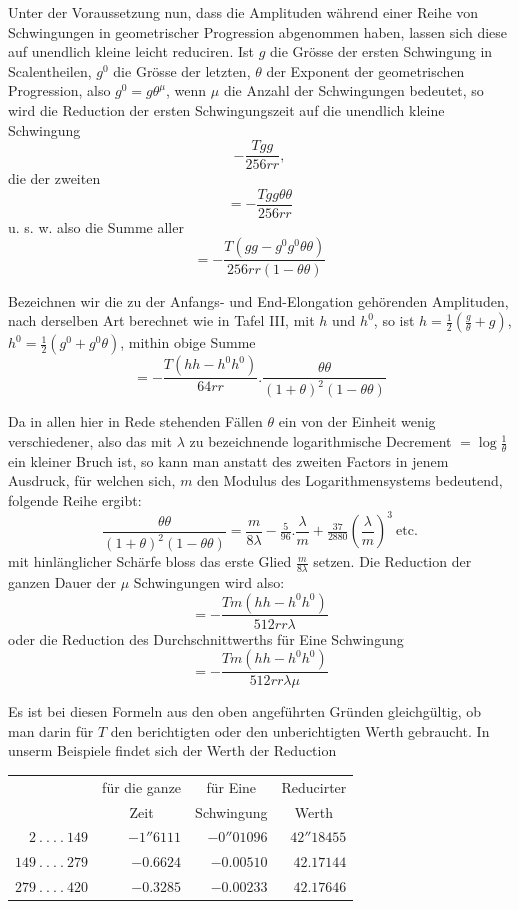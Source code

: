 Unter der Voraussetzung nun, dass die Amplituden während einer Reihe von Schwingungen in geometrischer Progression abgenommen haben, lassen sich diese auf unendlich kleine leicht reduciren. Ist $g$ die Grösse der ersten Schwingung in Scalentheilen, $g^0$ die Grösse der letzten, $\theta$ der Exponent der geometrischen Progression, also $g^0=g\theta^\mu$, wenn $\mu$ die Anzahl der Schwingungen bedeutet, so wird die Reduction der ersten Schwingungszeit auf die unendlich kleine Schwingung
\[
-\frac{Tgg}{256rr},
\]
die der zweiten
\[
=-\frac{Tgg\theta\theta}{256rr}
\]
u. s. w. also die Summe aller
\[
=-\frac{T(gg-g^0g^0\theta\theta)}{256rr(1-\theta\theta)}
\]

Bezeichnen wir die zu der Anfangs- und End-Elongation gehörenden Amplituden, nach derselben Art berechnet wie in Tafel III, mit $h$ und $h^0$, so ist $h=\tfrac12(\frac{g}{\theta}+g)$, $h^0=\tfrac12(g^0+g^0\theta)$, mithin obige Summe
\[
=-\frac{T(hh-h^0h^0)}{64rr}.\frac{\theta\theta}{(1+\theta)^2(1-\theta\theta)}
\]

Da in allen hier in Rede stehenden Fällen $\theta$ ein von der Einheit wenig verschiedener, also das mit $\lambda$ zu bezeichnende logarithmische Decrement $=\log\frac1\theta$ ein kleiner Bruch ist, so kann man anstatt des zweiten Factors in jenem Ausdruck, für welchen sich, $m$ den Modulus des Logarithmensystems bedeutend, folgende Reihe ergibt:
\[
\frac{\theta\theta}{(1+\theta)^2(1-\theta\theta)}=\frac{m}{8\lambda}-\tfrac5{96}.\frac{\lambda}{m}+\tfrac{37}{2880}(\frac{\lambda}{m})^3\ \text{etc.}
\]
mit hinlänglicher Schärfe bloss das erste Glied $\frac{m}{8\lambda}$ setzen. Die Reduction der ganzen Dauer der $\mu$ Schwingungen wird also:
\[
=-\frac{Tm(hh-h^0h^0)}{512rr\lambda}
\]
oder die Reduction des Durchschnittwerths für Eine Schwingung
\[
=-\frac{Tm(hh-h^0h^0)}{512rr\lambda\mu}
\]

Es ist bei diesen Formeln aus den oben angeführten Gründen gleichgültig, ob man darin für $T$ den berichtigten oder den unberichtigten Werth gebraucht. In unserm Beispiele findet sich der Werth der Reduction
\begin{center}
\fontsize{9}{11}\selectfont
\begin{tabular}{r|r|r|r}
& \multicolumn{1}{c|}{für die ganze} & \multicolumn{1}{c|}{für Eine} & \multicolumn{1}{c}{Reducirter}\\
& \multicolumn{1}{c|}{Zeit} & \multicolumn{1}{c|}{Schwingung} & \multicolumn{1}{c}{Werth}\\[5pt]
$2\ .\ .\ .\ .\ 149$ & $-1''6111$ & $-0''01096$ & $42''18455$\\
$149\ .\ .\ .\ .\ 279$ & $-0.6624$ & $-0.00510$ & $42.17144$\\
$279\ .\ .\ .\ .\ 420$ & $-0.3285$ & $-0.00233$ & $42.17646$
\end{tabular}
\end{center}

